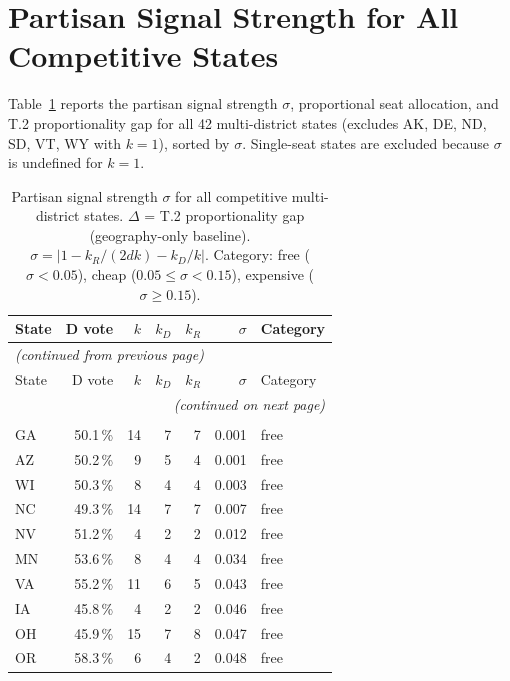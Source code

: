 \appendix

\section{Partisan Signal Strength for All Competitive States}
\label{appendix:sigma}

Table~\ref{tab:sigma-full} reports the partisan signal strength $\sigma$,
proportional seat allocation, and T.2 proportionality gap for all 42
multi-district states (excludes AK, DE, ND, SD, VT, WY with $k=1$), sorted
by $\sigma$.
Single-seat states are excluded because $\sigma$ is undefined for $k=1$.

\begin{longtable}{lrrrrrl}
\caption{Partisan signal strength $\sigma$ for all competitive multi-district
  states. $\Delta$ = T.2 proportionality gap (geography-only baseline).
  $\sigma = |1 - k_R/(2dk) - k_D/k|$. Category: free ($\sigma < 0.05$),
  cheap ($0.05 \leq \sigma < 0.15$), expensive ($\sigma \geq 0.15$).}
\label{tab:sigma-full} \\
\toprule
State & D vote & $k$ & $k_D$ & $k_R$ & $\sigma$ & Category \\
\midrule
\endfirsthead
\multicolumn{7}{l}{\emph{(continued from previous page)}} \\
\toprule
State & D vote & $k$ & $k_D$ & $k_R$ & $\sigma$ & Category \\
\midrule
\endhead
\midrule
\multicolumn{7}{r}{\emph{(continued on next page)}} \\
\endfoot
\bottomrule
\endlastfoot
\multicolumn{7}{l}{\textit{Free proportionality ($\sigma < 0.05$) --- 19 states}} \\
GA & 50.1\,\% & 14 &  7 &  7 & 0.001 & free \\
AZ & 50.2\,\% &  9 &  5 &  4 & 0.001 & free \\
WI & 50.3\,\% &  8 &  4 &  4 & 0.003 & free \\
NC & 49.3\,\% & 14 &  7 &  7 & 0.007 & free \\
NV & 51.2\,\% &  4 &  2 &  2 & 0.012 & free \\
MN & 53.6\,\% &  8 &  4 &  4 & 0.034 & free \\
VA & 55.2\,\% & 11 &  6 &  5 & 0.043 & free \\
IA & 45.8\,\% &  4 &  2 &  2 & 0.046 & free \\
OH & 45.9\,\% & 15 &  7 &  8 & 0.047 & free \\
OR & 58.3\,\% &  6 &  4 &  2 & 0.048 & free \\

\end{longtable}
